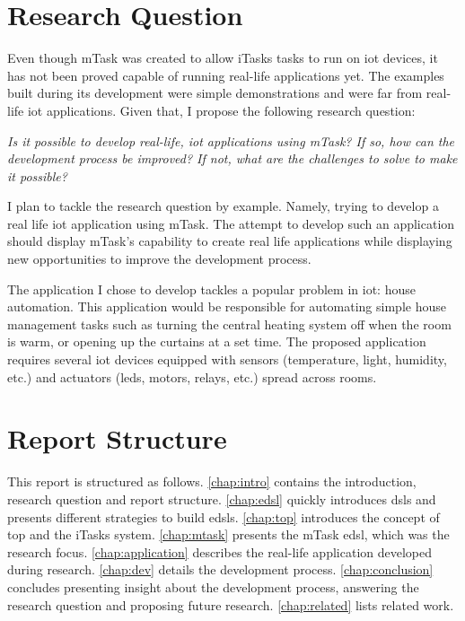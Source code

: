 \section{Research Question}
Even though mTask was created to allow iTasks tasks to run on \acs{iot} devices, it has not been proved capable of running real-life applications yet. The examples built during its development were simple demonstrations and were far from real-life \acs{iot} applications. Given that, I propose the following research question:
\begin{center}
\emph{Is it possible to develop real-life, \acs{iot} applications using mTask? If so, how can the development process be improved? If not, what are the challenges to solve to make it possible?}
\end{center}
I plan to tackle the research question by example. Namely, trying to develop a real life \acs{iot} application using mTask. The attempt to develop such an application should display mTask's capability to create real life applications while displaying new opportunities to improve the development process.

The application I chose to develop tackles a popular problem in \acrshort{iot}: house automation. This application would be responsible for automating simple house management tasks such as turning the central heating system off when the room is warm, or opening up the curtains at a set time. The proposed application requires several \acrshort{iot} devices equipped with sensors (temperature, light, humidity, etc.) and actuators (\acsp{led}, motors, relays, etc.) spread across rooms. 


\section{Report Structure}

This report is structured as follows. \cref{chap:intro} contains the introduction, research question and report structure. \cref{chap:edsl} quickly introduces \acp{dsl} and presents different strategies to build \acp{edsl}. \cref{chap:top} introduces the concept of \ac{top} and the iTasks system. \cref{chap:mtask} presents the mTask \ac{edsl}, which was the research focus. \cref{chap:application} describes the real-life application developed during research. \cref{chap:dev} details the development process. \cref{chap:conclusion} concludes presenting insight about the development process, answering the research question and proposing future research. \cref{chap:related} lists related work.

